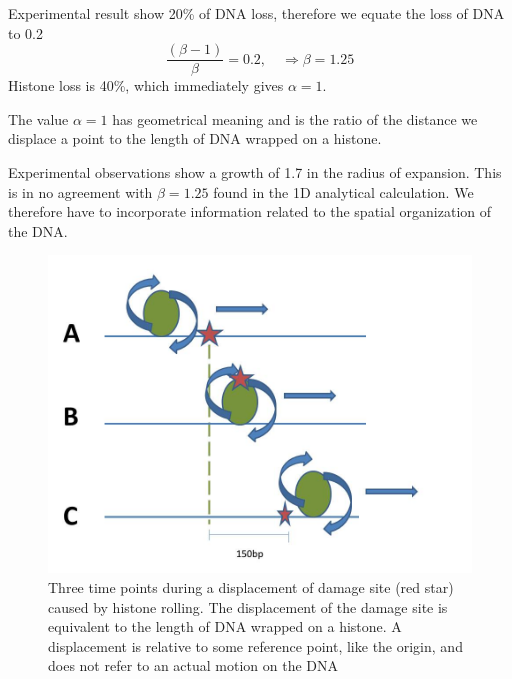 \documentclass[12pt]{paper}
\begin{document}
     Experimental result show 20\% of DNA loss, therefore we equate the loss of DNA to 0.2 
     \begin{equation*}
     \frac{(\beta -1)}{\beta}=0.2, \quad \Rightarrow \beta = 1.25
     \end{equation*}     
     Histone loss is 40\%, which immediately gives $\alpha =1$.
              
     The value $\alpha=1$ has geometrical meaning and is the ratio of the distance we displace a point to the length of DNA wrapped on a histone. 
     
     Experimental observations show a growth of 1.7 in the radius of expansion. This is in no agreement with $\beta=1.25$ found in the 1D analytical calculation. We therefore have to incorporate information related to the spatial organization of the DNA. 
        
      
	\begin{figure}
	\centering
	\includegraphics[width=0.7\linewidth]{histoneSlidingSingle}
	\caption{{Three time points during a displacement of damage site (red star) caused by histone rolling. The displacement of the damage site is equivalent to the length of DNA wrapped on a histone. A displacement is relative to some reference point, like the origin, and does not refer to an actual motion on the DNA}}
	\label{fig:histoneSlidingSingle}
	\end{figure}
		
\end{document}
